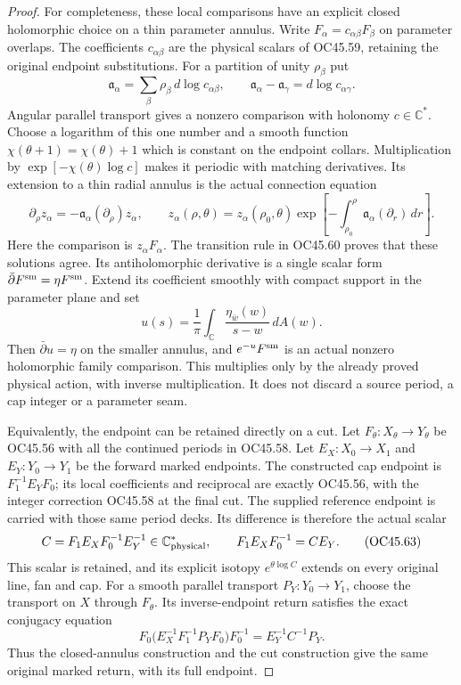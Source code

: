 \begin{proof}
For completeness, these local comparisons have an explicit
closed holomorphic choice on a thin parameter annulus.
Write \(F_\alpha=c_{\alpha\beta}F_\beta\) on parameter overlaps.
The coefficients \(c_{\alpha\beta}\) are the physical scalars
of OC45.59, retaining the original endpoint substitutions.
For a partition of unity \(\rho_\beta\) put
\[
 \mathfrak a_\alpha=\sum_\beta\rho_\beta\,d\log c_{\alpha\beta},
 \qquad
 \mathfrak a_\alpha-\mathfrak a_\gamma=d\log c_{\alpha\gamma}.
 \tag{OC45.60}
\]
Angular parallel transport gives a nonzero comparison with
holonomy \(c\in\mathbb C^*\). Choose a logarithm of this one
number and a smooth function \(\chi(\theta+1)=\chi(\theta)+1\)
which is constant on the endpoint collars. Multiplication by
\(\exp[-\chi(\theta)\log c]\) makes it periodic with matching
derivatives. Its extension to a thin radial annulus is the
actual connection equation
\[
 \partial_\rho z_\alpha
       =-\mathfrak a_\alpha(\partial_\rho)z_\alpha,\qquad
 z_\alpha(\rho,\theta)=z_\alpha(\rho_0,\theta)
       \exp\left[-\int_{\rho_0}^{\rho}
                 \mathfrak a_\alpha(\partial_r)\,dr\right].
 \tag{OC45.61}
\]
Here the comparison is \(z_\alpha F_\alpha\). The transition
rule in OC45.60 proves that these solutions agree. Its
antiholomorphic derivative is a single scalar form
\(\bar\partial F^{\rm sm}=\eta F^{\rm sm}\). Extend its
coefficient smoothly with compact support in the parameter
plane and set
\[
 u(s)=\frac1\pi\int_{\mathbb C}
                    \frac{\eta_{\bar w}(w)}{s-w}\,dA(w).
 \tag{OC45.62}
\]
Then \(\bar\partial u=\eta\) on the smaller annulus, and
\(e^{-u}F^{\rm sm}\) is an actual nonzero holomorphic family
comparison. This multiplies only by the already proved
physical action, with inverse multiplication. It does not
discard a source period, a cap integer or a parameter seam.

Equivalently, the endpoint can be retained directly on a cut.
Let \(F_\theta:X_\theta\to Y_\theta\) be OC45.56 with all
the continued periods in OC45.58. Let \(E_X:X_0\to X_1\)
and \(E_Y:Y_0\to Y_1\) be the forward marked endpoints.
The constructed cap endpoint is \(F_1^{-1}E_YF_0\); its
local coefficients and reciprocal are exactly OC45.56,
with the integer correction OC45.58 at the final cut.
The supplied reference endpoint is carried with those same
period decks. Its difference is therefore the actual scalar
\[
 C=F_1E_XF_0^{-1}E_Y^{-1}\in\mathbb C^*_{\rm physical},
 \qquad F_1E_XF_0^{-1}=CE_Y .
 \tag{OC45.63}
\]
This scalar is retained, and its explicit isotopy
\(e^{\theta\log C}\) extends on every original line, fan and cap.
For a smooth parallel transport \(P_Y:Y_0\to Y_1\), choose
the transport on \(X\) through \(F_\theta\). Its inverse-endpoint
return satisfies the exact conjugacy equation
\[
 F_0\bigl(E_X^{-1}F_1^{-1}P_YF_0\bigr)F_0^{-1}
           =E_Y^{-1}C^{-1}P_Y .
 \tag{OC45.64}
\]
Thus the closed-annulus construction and the cut construction
give the same original marked return, with its full endpoint.


\end{proof}
